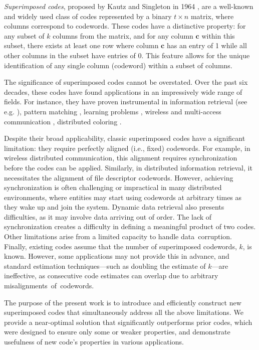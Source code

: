 \documentclass[11pt]{article}
\begin{document}
\textit{Superimposed codes}, proposed by Kautz and Singleton in 1964 \cite{KS1964}, are a well-known and widely used class 
of codes represented by a binary $t \times n$ matrix, where columns correspond to codewords. 
These codes have a distinctive property: for any subset of  
$k$ columns from the matrix, and for any column $\mathbf{c}$ within this subset, there exists at least one row where 
column $\mathbf{c}$ has an entry of 1 while all other columns in the subset have entries of 0. 
This feature allows for the unique identification of any single column (codeword) within a subset of columns.

The significance of superimposed codes cannot be overstated. 
Over the past six decades, these codes have found applications in an impressively wide range of fields. 
For instance, they have proven instrumental in information retrieval (see e.g. \cite[p.~570]{K1998}), 
pattern matching \cite{I1997, PR11}, learning problems \cite{AA2005, KesselheimKN15},
wireless and multi-access communication \cite{J1985, I2002, Chrobak2000}, 
distributed coloring \cite{N1992, RG2010}.


Despite their broad applicability, classic superimposed codes have a significant limitation: they require 
perfectly aligned (i.e., fixed) codewords. For example, in wireless distributed communication, this alignment 
requires synchronization before the codes can be applied. Similarly, in distributed information retrieval, 
it necessitates the alignment of file descriptor codewords. However, achieving synchronization is often challenging 
or impractical in many distributed 
environments, where entities may start using codewords at arbitrary 
times as they wake up and join the system. Dynamic data retrieval also presents difficulties, as it may 
involve data arriving out of order. The lack of synchronization creates a difficulty in defining a meaningful product of two codes. Other limitations arise from a limited capacity to handle data~corruption.
Finally, existing codes assume that the number of superimposed codewords, 
$k$, is known. However, some applications may not provide this in advance, and standard estimation techniques—such as doubling the estimate of 
$k$—are ineffective, as consecutive code estimates can overlap due to arbitrary misalignments~of~codewords.



The purpose of the present work is to introduce and efficiently construct new superimposed codes that 
simultaneously address all the above limitations. 
We provide a near-optimal solution that significantly 
outperforms prior codes, which were designed to ensure only some or weaker properties, and demonstrate usefulness of new code's properties in various applications.
\end{document}
